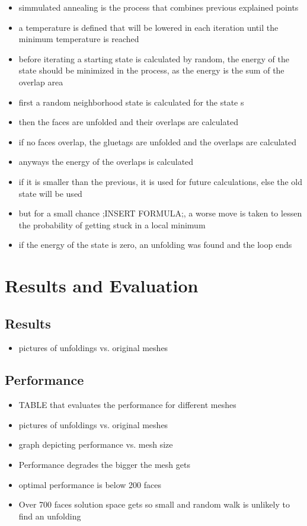 \documentclass[draft,final]{vutinfth} %
\begin{document}
\begin{itemize}
	\item simmulated annealing is the process that combines previous explained points
	\item a temperature is defined that will be lowered in each iteration until the minimum temperature is reached
	\item before iterating a starting state is calculated by random, the energy of the state should be minimized in the process, as the energy is the sum of the overlap area
	\item first a random neighborhood state is calculated for the state s
	\item then the faces are unfolded and their overlaps are calculated
	\item if no faces overlap, the gluetags are unfolded and the overlaps are calculated
	\item anyways the energy of the overlaps is calculated	
	\item if it is smaller than the previous, it is used for future calculations, else the old state will be used
	\item but for a small chance ;INSERT FORMULA;, a worse move is taken to lessen the probability of getting stuck in a local minimum
	\item if the energy of the state is zero, an unfolding was found and the loop ends
\end{itemize}

\chapter{Results and Evaluation}

\section{Results}

\begin{itemize}
	\item pictures of unfoldings vs. original meshes
\end{itemize}

\section{Performance}

\begin{itemize}
	\item TABLE that evaluates the performance for different meshes
	\item pictures of unfoldings vs. original meshes
	\item graph depicting performance vs. mesh size
	\item Performance degrades the bigger the mesh gets
	\item optimal performance is below 200 faces
	\item Over 700 faces solution space gets so small and random walk is unlikely to find an unfolding
\end{itemize}
\end{document}
